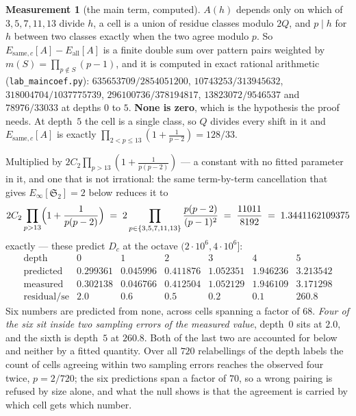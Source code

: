 \documentclass[11pt,a4paper]{article}
\theoremstyle{plain}
\theoremstyle{definition}
\newtheorem{measurement}[theorem]{Measurement}
\theoremstyle{remark}
\renewcommand{\SS}{\mathfrak{S}}
\begin{document}
\begin{measurement}[the main term, computed]\label{meas:maincoef}
$A(h)$ depends only on which of $3,5,7,11,13$ divide $h$, a cell is a
union of residue classes modulo $2Q$, and $p\mid h$ for $h$ between two
classes exactly when the two agree modulo $p$. So
$E_{\mathrm{same},c}[A]-E_{\mathrm{all}}[A]$ is a finite double sum
over pattern pairs weighted by $m(S)=\prod_{p\notin S}(p-1)$, and it is
computed in exact rational arithmetic
(\texttt{lab\_maincoef.py}): $635653709/2854051200$,
$10743253/313945632$, $318004704/1037775739$, $296100736/378194817$,
$13823072/9546537$ and $78976/33033$ at depths $0$ to $5$. \textbf{None
is zero}, which is the hypothesis the proof needs. At depth~$5$ the
cell is a single class, so $Q$ divides every shift in it and
$E_{\mathrm{same},c}[A]$ is exactly
$\prod_{2<p\le13}(1+\frac1{p-2})=128/33$.

Multiplied by $2C_2\prod_{p>13}(1+\frac1{p(p-2)})$ --- a constant with
no fitted parameter in it, and one that is not irrational: the same
term-by-term cancellation that gives $E_\infty[\SS_2]=2$ below reduces
it to
\[
  2C_2\prod_{p>13}\Bigl(1+\frac1{p(p-2)}\Bigr)
  \;=\;2\prod_{p\in\{3,5,7,11,13\}}\frac{p(p-2)}{(p-1)^2}
  \;=\;\frac{11011}{8192}\;=\;1.3441162109375
\]
exactly --- these predict $D_c$ at the octave
$(2\cdot10^6,4\cdot10^6]$:
\[
\begin{array}{r|cccccc}
 \text{depth} & 0 & 1 & 2 & 3 & 4 & 5\\\hline
 \text{predicted} & 0.299361 & 0.045996 & 0.411876 & 1.052351
   & 1.946236 & 3.213542\\
 \text{measured} & 0.302138 & 0.046766 & 0.412504 & 1.052129
   & 1.946109 & 3.171298\\
 \text{residual}/\mathrm{se} & 2.0 & 0.6 & 0.5 & 0.2 & 0.1 & 260.8
\end{array}
\]
Six numbers are predicted from none, across cells spanning a factor of
$68$. \emph{Four of the six sit inside two sampling errors of the
measured value}, depth~$0$ sits at $2.0$, and the sixth is depth~$5$ at
$260.8$. Both of the last two are accounted for below and neither by a
fitted quantity. Over all $720$ relabellings of the depth
labels the count of cells agreeing within two sampling errors reaches
the observed four twice, $p=2/720$; the six predictions span a factor
of $70$, so a wrong pairing is refused by size alone, and what the null
shows is that the agreement is carried by which cell gets which
number.


\end{measurement}
\end{document}
